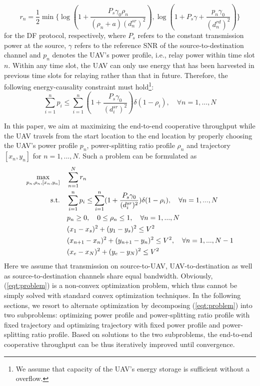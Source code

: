 \documentclass[12pt, draftclsnofoot, onecolumn]{IEEEtran}
\begin{document}
\begin{equation}\label{eqt:df}
r_{n}=\dfrac{1}{2}\min\{\log (1+\dfrac{P_{s}\gamma_{0}\rho_{n}}{(\rho_{n}+a)(d^{sr}_{n})^{2}}), \log (1+P_{s}\gamma+\dfrac{p_{n}\gamma_{0}}{(d^{rd}_{n})^{2}})\}  
\end{equation}
for the DF protocol, respectively, where $P_{s}$ refers to the constant transmission power at the source, $\gamma$ refers to the reference SNR of the source-to-destination channel and $p_{n}$ denotes the UAV's power profile, i.e., relay power within time slot $n$. Within any time slot, the UAV can only use energy that has been harvested in previous time slots for relaying rather than that in future. Therefore, the following energy-causality constraint\cite{5992841} must hold\footnote{We assume that capacity of the UAV's energy storage is sufficient without a overflow.}:
\begin{equation}\label{eqt:energy_causality}
\sum\limits _{i=1}^{n}p_{i}\leq\sum\limits _{i=1}^{n}(1+\dfrac{P_{s}\gamma_{0}}{(d^{sr}_{i})^{2}})\delta(1-\rho_{i}),\quad \forall n=1,...,N
\end{equation}








In this paper, we aim at maximizing the end-to-end cooperative throughput while the UAV travels from the start location to the end location by properly choosing the UAV's power profile $p_{n}$, power-splitting ratio profile $\rho_{n}$ and trajectory $[x_{n},y_{n}]$ for $n=1,...,N$. Such a problem can be formulated as 
\begin{equation}\label{eqt:problem}
\begin{aligned}
\max\limits_{p_{n},\rho_{n},[x_{n},y_{n}]}\quad &\sum\limits _{n=1}^{N}r_{n}\\
{\rm s.t.}\quad &\sum\limits _{i=1}^{n}p_{i}\leq\sum\limits _{i=1}^{n}(1+\dfrac{P_{s}\gamma_{0}}{(d^{sr}_{i})^{2}})\delta(1-\rho_{i}),\quad \forall n=1,...,N\\
&p_{n}\geq 0,\quad 0\leq\rho_{n}\leq 1, \quad \forall n=1,...,N\\
&(x_{1}-x_{s})^{2}+(y_{1}-y_{s})^{2}\leq V^{2}\\
&(x_{n+1}-x_{n})^{2}+(y_{n+1}-y_{n})^{2}\leq V^{2},\quad\forall n=1,...,N-1\\
&(x_{e}-x_{N})^{2}+(y_{e}-y_{N})^{2}\leq V^{2}
\end{aligned}
\end{equation}
Here we assume that transmission on source-to-UAV, UAV-to-destination as well as source-to-destination channels share equal bandwidth. Obviously, (\ref{eqt:problem}) is a non-convex optimization problem, which thus cannot be simply solved with standard convex optimization techniques. In the following sections, we resort to alternate optimization by decomposing (\ref{eqt:problem}) into two subproblems: optimizing power profile and power-splitting ratio profile with fixed trajectory and optimizing trajectory with fixed power profile and power-splitting ratio profile. Based on solutions to the two subproblems, the end-to-end cooperative throughput can be thus iteratively improved until convergence.
\end{document}
